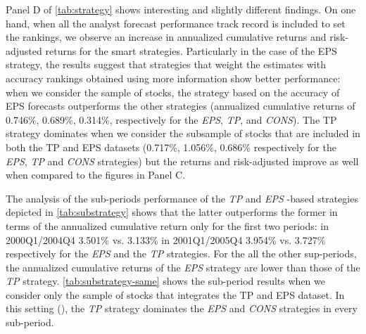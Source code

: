 \documentclass[a4paper,twoside,12pt,openright,notitlepage]{report}\usepackage[]{graphicx}\usepackage[]{color}
\begin{document}
Panel D of \ref{tab:strategy} shows interesting and slightly different findings. On one hand, when all the analyst forecast performance track record is included to set the rankings, we observe an increase in annualized cumulative returns and risk-adjusted returns for the smart strategies. Particularly in the case of the EPS strategy, the results suggest that strategies that weight the estimates with accuracy rankings obtained using more information show better performance: when we consider the \all{} sample of stocks, the strategy based on the accuracy of EPS forecasts outperforms the other strategies (annualized cumulative returns of 0.746\%, 0.689\%, 0.314\%, respectively for the \textit{EPS}, \textit{TP}, and \textit{CONS}). The TP strategy dominates when we consider the subsample of stocks that are included in both the TP and EPS datasets (0.717\%, 1.056\%, 0.686\% respectively for the \textit{EPS}, \textit{TP} and \textit{CONS} strategies) but the returns and risk-adjusted improve as well when compared to the figures in Panel C.




The analysis of the sub-periods performance of the \textit{TP} and \textit{EPS} -based strategies depicted in \ref{tab:substrategy} shows that the latter outperforms the former in terms of the annualized cumulative return only for the first two periods: in  2000Q1/2004Q4  3.501\% vs. 3.133\%  in 2001Q1/2005Q4 3.954\%  vs. 3.727\% respectively for the \textit{EPS} and the \textit{TP} strategies. For the all the other sup-periods, the annualized cumulative returns of the \textit{EPS} strategy are lower than those of the \textit{TP} strategy.
\ref{tab:substrategy-same} shows the sub-period results when we consider only the sample of stocks that integrates the TP and EPS dataset. In this setting (\same{}), the \textit{TP} strategy dominates the \textit{EPS} and \textit{CONS} strategies in every sub-period.
\end{document}

